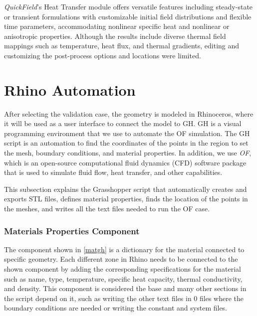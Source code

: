 \textit{QuickField}'s Heat Transfer module offers versatile features including steady-state or transient formulations with customizable initial field distributions and flexible time parameters, accommodating nonlinear specific heat and nonlinear or anisotropic properties. Although the results include diverse thermal field mappings such as temperature, heat flux, and thermal gradients, editing and customizing the post-process options and locations were limited.




\section{Rhino  Automation} %
After selecting the validation case, the geometry is modeled in Rhinoceros, where it will be used as a user interface to connect the model to \gls{GH}. \gls{GH} is a visual programming environment that we use to automate the \gls{OF} simulation. The \gls{GH} script is an automation to find the coordinates of the points in the region to set the mesh, boundary conditions, and material properties. 
In addition, we use \textit{\gls{OF}}, which is an open-source computational fluid dynamics (CFD) software package that is used to simulate fluid flow, heat transfer, and other capabilities. 

This subsection explains the Grasshopper script that automatically creates and exports STL files, defines material properties, finds the location of the points in the meshes, and writes all the text files needed to run the \gls{OF} case.

\subsubsection{Materials Properties Component}
The component shown in \ref{matgh} is a dictionary for the material connected to specific geometry. Each different zone in Rhino needs to be connected to the shown component by adding the corresponding specifications for the material such as name, type, temperature, specific heat capacity, thermal conductivity, and density. This component is considered the base and many other sections in the script depend on it, such as writing the other text files in 0 files where the boundary conditions are needed or writing the constant and system files. 


